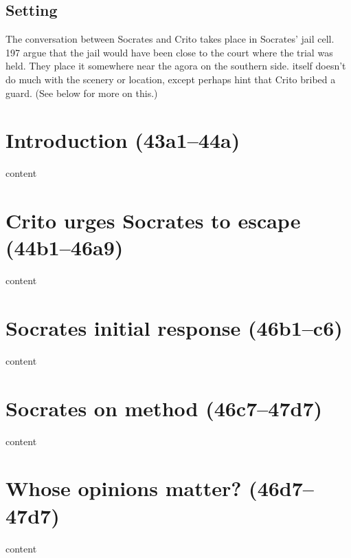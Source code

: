 \documentclass[11pt]{article}
\begin{document}
\subsection{Setting}

The conversation between Socrates and Crito takes place in Socrates' jail cell.  \citet{brickhouse2004} 197 argue that the jail would have been close to the court where the trial was held.  They place it somewhere near the agora on the southern side.   itself doesn't do much with the scenery or location, except perhaps hint that Crito bribed a guard.  (See below for more on this.)

\section{Introduction (43a1--44a)}

content

\section{Crito urges Socrates to escape (44b1--46a9)}

content

\section{Socrates initial response (46b1--c6)}

content

\section{Socrates on method (46c7--47d7)}

content

\section{Whose opinions matter? (46d7--47d7)}

content

\end{document}
